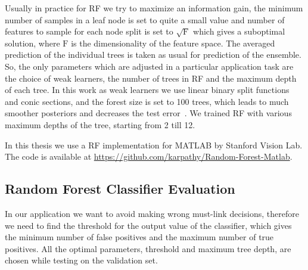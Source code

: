 Usually in practice for RF we try to maximize an information gain, the minimum number of samples in a leaf node is set to quite a small value and number of features to sample for each node split
is set to $\mathrm{\sqrt{F}}$ which gives a suboptimal solution, where $\mathrm{F}$ is the dimensionality of the feature space.
The averaged prediction of the individual trees is taken as usual for prediction of the ensemble.
So, the only parameters which are adjusted in a particular application task
are the choice of weak learners, the number of trees in RF and the maximum depth of each tree. In this work as weak learners we use linear binary split functions and conic sections, and the forest size is set to 100 trees, 
which leads to much smoother posteriors and decreases the test error~\cite{Criminisi12}.
We trained RF with various maximum depths of the tree, starting from 2 till 12. %

In this thesis we use a RF implementation for MATLAB by Stanford Vision Lab. The code is available at \url{https://github.com/karpathy/Random-Forest-Matlab}.
\subsection{Random Forest Classifier Evaluation}
In our application we want to avoid making wrong must-link decisions, therefore we need to find the threshold for the output value of the classifier, which gives the minimum number of false positives and 
the maximum number of true positives. All the optimal parameters, threshold and maximum tree depth, are chosen while testing on the validation set.

